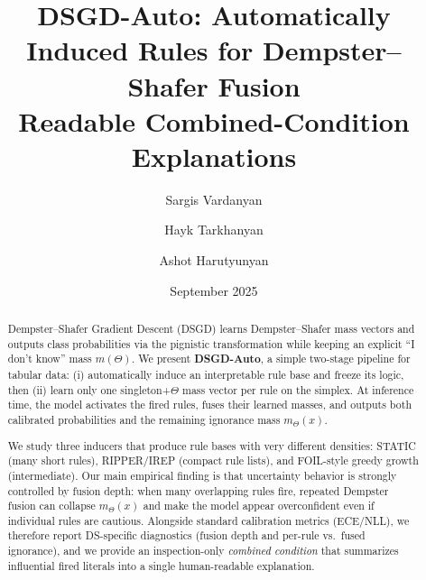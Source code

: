 \documentclass[11pt,a4paper]{article}
\title{DSGD-Auto: Automatically Induced Rules for Dempster--Shafer Fusion\\
Readable Combined-Condition Explanations}
\author{Sargis Vardanyan \and Hayk Tarkhanyan \and Ashot Harutyunyan}
\date{September 2025}
\providecommand{\1}{}
\renewcommand{\1}{\mathbbm{1}}
\begin{document}
\maketitle

\begin{abstract}
Dempster--Shafer Gradient Descent (DSGD) learns Dempster--Shafer mass vectors and outputs class probabilities via the pignistic transformation while keeping an explicit ``I don't know'' mass $m(\Theta)$.
We present \textbf{DSGD-Auto}, a simple two-stage pipeline for tabular data: (i) automatically induce an interpretable rule base and freeze its logic, then (ii) learn only one singleton+$\Theta$ mass vector per rule on the simplex.
At inference time, the model activates the fired rules, fuses their learned masses, and outputs both calibrated probabilities and the remaining ignorance mass $m_\Theta(x)$.

We study three inducers that produce rule bases with very different densities: STATIC (many short rules), RIPPER/IREP (compact rule lists), and FOIL-style greedy growth (intermediate).
Our main empirical finding is that uncertainty behavior is strongly controlled by fusion depth: when many overlapping rules fire, repeated Dempster fusion can collapse $m_\Theta(x)$ and make the model appear overconfident even if individual rules are cautious.
Alongside standard calibration metrics (ECE/NLL), we therefore report DS-specific diagnostics (fusion depth and per-rule vs.\ fused ignorance), and we provide an inspection-only \emph{combined condition} that summarizes influential fired literals into a single human-readable explanation.
\end{abstract}
\end{document}
